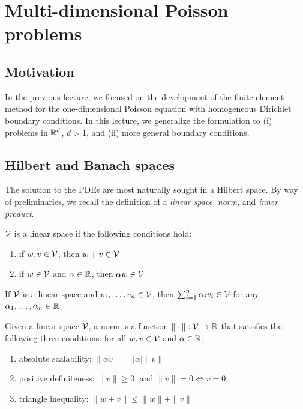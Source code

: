 \chapter{Multi-dimensional Poisson problems}

\disclaimer

\section{Motivation}
In the previous lecture, we focused on the development of the finite element method for the one-dimensional Poisson equation with homogeneous Dirichlet boundary conditions. In this lecture, we generalize the formulation to (i) problems in $\mathbb{R}^d$, $d > 1$, and (ii) more general boundary conditions.  

\section{Hilbert and Banach spaces}
The solution to the PDEs are most naturally sought in a Hilbert space. By way of preliminaries, we recall the definition of a \emph{linear space}, \emph{norm}, and \emph{inner product}.
\begin{definition}
  $\mathcal{V}$ is a linear space if the following conditions hold:
  \begin{enumerate}
  \item if $w,v \in \mathcal{V}$, then $w + v \in \mathcal{V}$
  \item if $w \in \mathcal{V}$ and $\alpha \in \mathbb{R}$, then $\alpha w \in \mathcal{V}$
  \end{enumerate}
\end{definition}
\begin{corollary}
  If $\mathcal{V}$ is a linear space and $v_1,\dots,v_n \in \mathcal{V}$, then $\sum_{i=1}^n \alpha_i v_i \in \mathcal{V}$ for any $\alpha_1, \dots, \alpha_n \in \mathbb{R}$.
\end{corollary}
\begin{definition}[norm]
  Given a linear space $\mathcal{V}$, a norm is a function $\| \cdot \| : \mathcal{V} \to \mathbb{R}$ that satisfies the following three conditions: for all $w,v \in \mathcal{V}$ and $\alpha \in \mathbb{R}$, 
  \begin{enumerate}
  \item absolute scalability: $\| \alpha v \| = |\alpha| \| v \|$
  \item positive definiteness: $ \| v \| \geq 0$,  and $\| v \| = 0 \Leftrightarrow v = 0$
  \item triangle inequality: $  \| w + v \| \leq \| w \| + \| v \| $
  \end{enumerate}
\end{definition}
